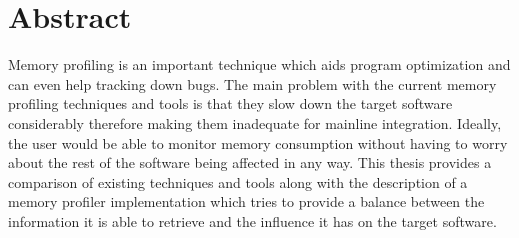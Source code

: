 \par\vfill

\chapter*{Abstract}

Memory profiling is an important technique which aids program optimization and can even help tracking down bugs. The main problem with the current memory profiling techniques and tools is that they slow down the target software considerably therefore making them inadequate for mainline integration. Ideally, the user would be able to monitor memory consumption without having to worry about the rest of the software being affected in any way. This thesis provides a comparison of existing techniques and tools along with the description of a memory profiler implementation which tries to provide a balance between the information it is able to retrieve and the influence it has on the target software.

\par\vfill\null
